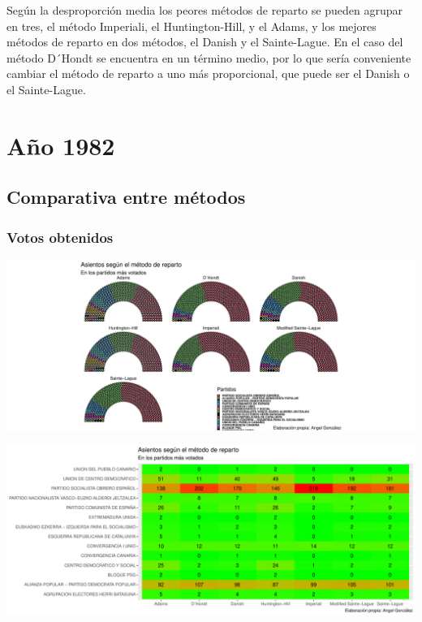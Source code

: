 \documentclass[12pt,a4paper,]{book}
\numberwithin{dummy}{section}
\theoremstyle{ocrenumbox}
\theoremstyle{blacknumex}
\theoremstyle{blacknumbox}
\theoremstyle{ocrenum}
\theoremstyle{ocrenum}
\begin{document}
Según la desproporción media los peores métodos de reparto se pueden
agrupar en tres, el método Imperiali, el Huntington-Hill, y el Adams, y
los mejores métodos de reparto en dos métodos, el Danish y el
Sainte-Lague. En el caso del método D´Hondt se encuentra en un término
medio, por lo que sería conveniente cambiar el método de reparto a uno
más proporcional, que puede ser el Danish o el Sainte-Lague.

\hypertarget{auxf1o-1982}{%
\section{Año 1982}\label{auxf1o-1982}}

\hypertarget{comparativa-entre-muxe9todos-2}{%
\subsection{Comparativa entre
métodos}\label{comparativa-entre-muxe9todos-2}}

\hypertarget{votos-obtenidos-2}{%
\subsubsection{Votos obtenidos}\label{votos-obtenidos-2}}

\begin{center}\includegraphics[width=0.95\linewidth]{figurasR/unnamed-chunk-80-1} \end{center}

\begin{center}\includegraphics[width=0.95\linewidth]{figurasR/unnamed-chunk-80-2} \end{center}
\end{document}
